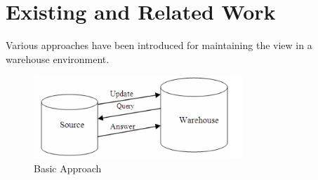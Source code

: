 \documentclass[12pt]{report}
\begin{document}
\section{Existing and Related Work}
Various  approaches  have  been  introduced  for  maintaining  
the view in a warehouse environment. 
\begin{figure}[H]
\centering \includegraphics[width=0.7\textwidth]{images/pic1.png}
\caption{Basic Approach}
\end{figure}
\end{document}
